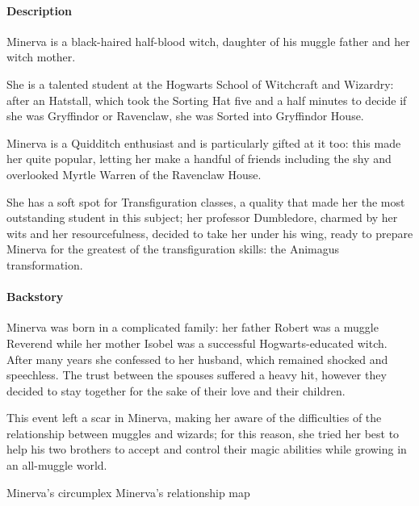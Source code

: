 
\paragraph{Description}
Minerva is a black-haired half-blood witch, daughter of his muggle father and her witch mother.

She is a talented student at the Hogwarts School of Witchcraft and Wizardry: after an Hatstall, which took the Sorting Hat five and a half minutes to decide if she was Gryffindor or Ravenclaw, she was Sorted into Gryffindor House. 

Minerva is a Quidditch enthusiast and is particularly gifted at it too: this made her quite popular, letting her make a handful of friends including the shy and overlooked Myrtle Warren of the Ravenclaw House.

She has a soft spot for Transfiguration classes, a quality that made her the most outstanding student in this subject; her professor Dumbledore, charmed by her wits and her resourcefulness, decided to take her under his wing, ready to prepare Minerva for the greatest of the transfiguration skills: the Animagus transformation.

\paragraph{Backstory}
Minerva was born in a complicated family: her father Robert was a muggle Reverend while her mother Isobel was a successful Hogwarts-educated witch. After many years she confessed to her husband, which remained shocked and speechless. The trust between the spouses suffered a heavy hit, however they decided to stay together for the sake of their love and their children.

This event left a scar in Minerva, making her aware of the difficulties of the relationship between muggles and wizards; for this reason, she tried her best to help his two brothers to accept and control their magic abilities while growing in an all-muggle world.
\pagebreak 

 {Minerva's circumplex}
\pagebreak 
{} {Minerva's relationship map}

\pagebreak



\clearpage
{}

\clearpage